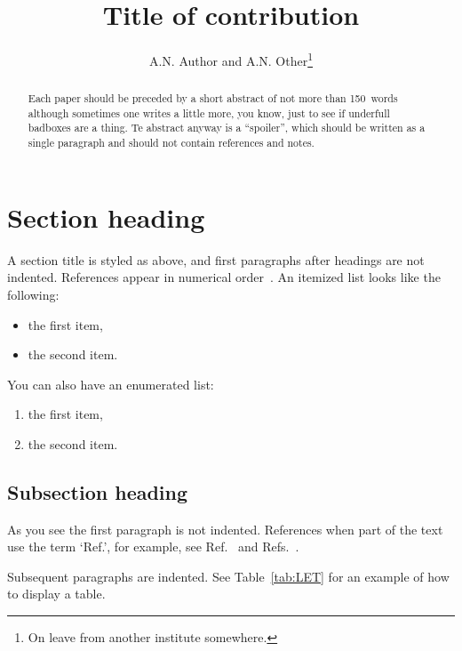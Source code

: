 \documentclass{cernrep}
\begin{document}
\title{Title of contribution}
\author{A.N. Author and A.N. Other\thanks
                 {On leave from another institute somewhere.}}


\begin{abstract}
Each paper should be preceded by a short abstract of not more
than 150~words although sometimes one writes a little more, you know,
just to see if underfull badboxes are a thing. Te abstract anyway is a ``spoiler'', which should be written as a single paragraph 
and should not contain references and notes.
\end{abstract}


\maketitle

\section{Section heading}

A section title is styled as above, and first paragraphs after
headings are not indented. References appear in numerical
order~\cite{Raby1966,Dupont1961}. An itemized list looks like the following:
\begin{itemize}
\item the first item,
\item the second item.
\end{itemize}

You can also have an enumerated list:

\begin{enumerate}
\item the first item,
\item the second item.
\end{enumerate}

\subsection{Subsection heading}

As you see the first paragraph is not indented. References when part
      of the text use the term `Ref.', for example, see
      Ref.~\cite{Raby1966} and
      Refs.~\cite{Appleman1959,vanBerg1965,Bryant1985,Allen1977}.

Subsequent paragraphs are indented. See Table~\ref{tab:LET} for an
example of how to display a table.
\end{document}
